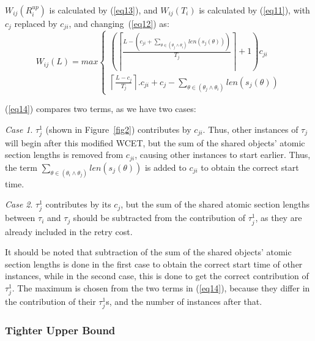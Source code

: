 \documentclass[letter]{sig-alternate}
\begin{document}
$W_{ij}(R_{i}^{up})$ is calculated by (\ref{eq13}), and $W_{ij}(T_{i})$
is calculated by (\ref{eq11}), with $c_{j}$ replaced by 
$c_{ji}$, and changing~(\ref{eq12}) as:
\begin{equation}
W_{ij}(L)=max\begin{cases}
\left(\left\lceil\frac{L-\left(c_{ji}+\sum_{\theta\in(\theta_{j}\wedge\theta_{i})}len(s_{j}(\theta))\right)}{T_{j}}\right\rceil+1 \right)c_{ji}\\
\left\lceil\frac{L-c_{j}}{T_{j}}\right\rceil.c_{ji}+c_{j}-\sum_{\theta\in(\theta_{j}\wedge\theta_{i})}len(s_{j}(\theta))\end{cases}\label{eq14}\end{equation}

(\ref{eq14}) compares two terms, as we have two cases:


\textit{Case 1}. $\tau_j^1$ (shown in Figure~\ref{fig2}) contributes by $c_{ji}$. Thus, other instances of $\tau_j$ will begin after this modified WCET, but the sum of the shared objects' atomic section lengths is removed from $c_{ji}$, causing other instances to start earlier. Thus, the term $\sum_{\theta\in(\theta_i\wedge\theta_j)} {len(s_{j}(\theta))}$ is added to $c_{ji}$ to obtain the correct start time. 

\textit{Case 2}. $\tau_j^1$ contributes by its $c_j$, but the sum of the shared atomic section lengths  between $\tau_i$ and $\tau_j$ should be subtracted from the contribution of $\tau_j^1$, as they are already included in the retry cost. 

It should be noted that subtraction of the sum of the shared objects' atomic section lengths is done in the first case to obtain the correct start time of other instances, while in the second case, this is done to get the correct contribution of $\tau_j^1$. The maximum is chosen from the two terms in (\ref{eq14}), because they differ in the contribution of their $\tau_j^1$s, and the number of instances after that.


\subsubsection{Tighter Upper Bound}
\end{document}
